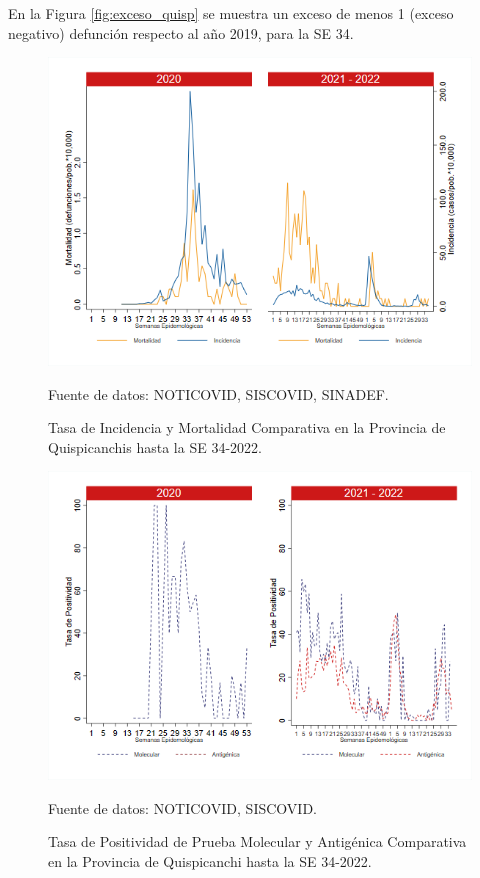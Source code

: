 \documentclass[12pt,a4paper,openany]{book}
\begin{document}
	En la Figura \ref{fig:exceso_quisp} se muestra un exceso de menos 1 (exceso negativo) defunción respecto al año 2019, para la SE 34.
	
	\begin{figure}[h]
		\caption{Tasa de Incidencia y Mortalidad Comparativa en la Provincia de Quispicanchis hasta la SE 34-2022.}\label{fig:inc_mort_quisp}
		\begin{center}
			\includegraphics[width=0.85\linewidth]{../figuras/incidencia_mortalidad_20_21_12.png}
		\end{center}
		{\footnotesize {Fuente de datos: NOTICOVID, SISCOVID, SINADEF.}}
	\end{figure}
	
	\begin{figure}[h]
		\caption{Tasa de Positividad de Prueba Molecular y Antigénica Comparativa en la Provincia de Quispicanchi hasta la SE 34-2022.}\label{fig:positividad_quisp}
		\begin{center}
			\includegraphics[width=0.7\linewidth]{../figuras/positividad_20_21_12.png}
		\end{center}
		{\footnotesize {Fuente de datos: NOTICOVID, SISCOVID.}}
	\end{figure}
	
\end{document}
